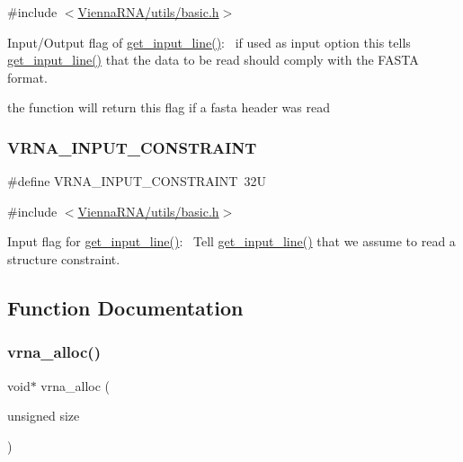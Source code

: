 {\ttfamily \#include $<$\hyperlink{utils_2basic_8h}{Vienna\+R\+N\+A/utils/basic.\+h}$>$}



Input/\+Output flag of \hyperlink{group__utils_ga8ef1835eb83f542396f59f0b205965e5}{get\+\_\+input\+\_\+line()}\+:~\newline
if used as input option this tells \hyperlink{group__utils_ga8ef1835eb83f542396f59f0b205965e5}{get\+\_\+input\+\_\+line()} that the data to be read should comply with the F\+A\+S\+TA format. 

the function will return this flag if a fasta header was read \mbox{\label{group__utils_gac08a9df45b9721b97a47dbfe7a6e5f85}} 
\subsubsection{\texorpdfstring{V\+R\+N\+A\+\_\+\+I\+N\+P\+U\+T\+\_\+\+C\+O\+N\+S\+T\+R\+A\+I\+NT}{VRNA\_INPUT\_CONSTRAINT}}
{\footnotesize\ttfamily \#define V\+R\+N\+A\+\_\+\+I\+N\+P\+U\+T\+\_\+\+C\+O\+N\+S\+T\+R\+A\+I\+NT~32U}



{\ttfamily \#include $<$\hyperlink{utils_2basic_8h}{Vienna\+R\+N\+A/utils/basic.\+h}$>$}



Input flag for \hyperlink{group__utils_ga8ef1835eb83f542396f59f0b205965e5}{get\+\_\+input\+\_\+line()}\+:~\newline
Tell \hyperlink{group__utils_ga8ef1835eb83f542396f59f0b205965e5}{get\+\_\+input\+\_\+line()} that we assume to read a structure constraint. 



\subsection{Function Documentation}
\mbox{\label{group__utils_gaf37a0979367c977edfb9da6614eebe99}} 
\subsubsection{\texorpdfstring{vrna\+\_\+alloc()}{vrna\_alloc()}}
{\footnotesize\ttfamily void$\ast$ vrna\+\_\+alloc (\begin{DoxyParamCaption}\item[{unsigned}]{size }\end{DoxyParamCaption})}



